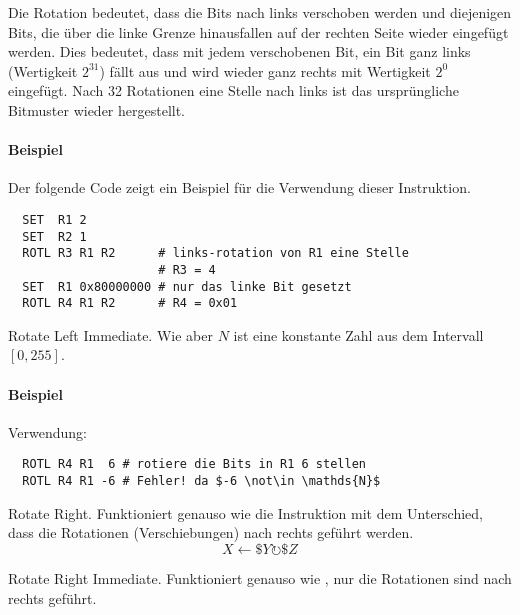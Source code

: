 Die Rotation bedeutet, dass die Bits nach links verschoben
werden und diejenigen Bits, die über die linke Grenze hinausfallen auf der
rechten Seite wieder eingefügt werden. 
Dies bedeutet, dass mit jedem verschobenen Bit, ein Bit ganz links (Wertigkeit
$2^{31}$) fällt aus und wird wieder ganz rechts mit Wertigkeit $2^{0}$ eingefügt.
Nach 32 Rotationen eine Stelle nach links ist das ursprüngliche Bitmuster
wieder hergestellt.

\paragraph{Beispiel}
Der folgende Code zeigt ein Beispiel für die Verwendung dieser Instruktion.
\begin{lstlisting}
  SET  R1 2
  SET  R2 1
  ROTL R3 R1 R2      # links-rotation von R1 eine Stelle
                     # R3 = 4
  SET  R1 0x80000000 # nur das linke Bit gesetzt
  ROTL R4 R1 R2      # R4 = 0x01
\end{lstlisting}


\glqq Rotate Left Immediate\grqq.
Wie  aber $N$ ist eine konstante Zahl aus dem Intervall $[0, 255]$.

\paragraph{Beispiel}
Verwendung:
\begin{lstlisting}
  ROTL R4 R1  6 # rotiere die Bits in R1 6 stellen
  ROTL R4 R1 -6 # Fehler! da $-6 \not\in \mathds{N}$
\end{lstlisting}



\glqq Rotate Right\grqq.
Funktioniert genauso wie die Instruktion  mit dem Unterschied, dass
die Rotationen (Verschiebungen) nach rechts geführt werden.
\[
    X \gets \$Y \circlearrowright \$Z
\]


\glqq Rotate Right Immediate\grqq.
Funktioniert genauso wie , nur die Rotationen sind nach rechts
geführt.



